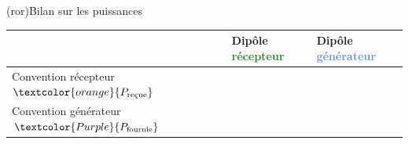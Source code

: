 \documentclass[../../main/main.tex]{subfiles}
\begin{document}
\begin{tcb*}[label=ror:convrg](ror){Bilan sur les puissances}
	\begin{tabularx}{\linewidth}{|Y*{2}{|Y}|}\hline
		                                                     &
		Dipôle \textcolor{ForestGreen}{récepteur}            &
		Dipôle \textcolor{CornflowerBlue}{générateur}
		\\\hline
		Convention récepteur
		\smallbreak $\textcolor{orange}{P_{\text{reçue}}}$   &
		                                                     &
		\\\hline
		Convention générateur
		\smallbreak $\textcolor{Purple}{P_{\text{fournie}}}$ &
\end{tabularx}
\end{tcb*}
\end{document}
